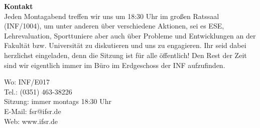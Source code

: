 \textbf{Kontakt} \\
Jeden Montagabend treffen wir uns um 18:30 Uhr im großen Ratssaal (INF/1004), um unter anderen über verschiedene Aktionen, sei es ESE, Lehrevaluation, Sporttuniere aber auch über Probleme und Entwicklungen an der Fakultät bzw. Universität zu diskutieren und uns zu engagieren.
Ihr seid dabei herzlichst eingeladen, denn die Sitzung ist für alle öffentlich!
Den Rest der Zeit sind wir eigentlich immer im Büro im Erdgeschoss der INF aufzufinden.

Wo: INF/E017 \\
Tel.: (0351) 463-38226 \\
Sitzung: immer montags 18:30 Uhr \\
E-Mail: fsr@ifsr.de \\
Web: www.ifsr.de